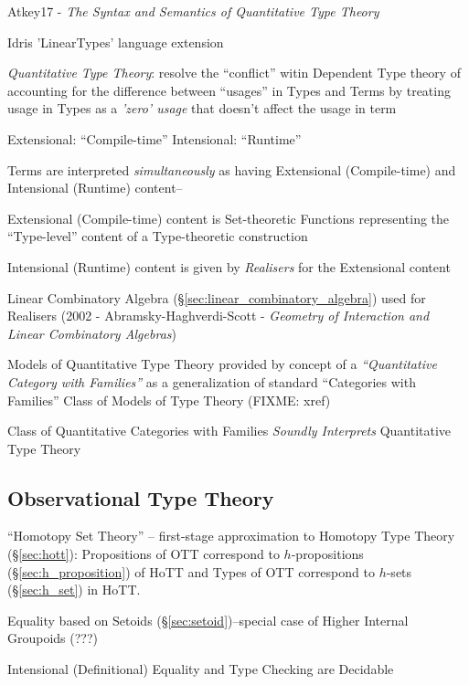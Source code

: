 Atkey17 - \emph{The Syntax and Semantics of Quantitative Type Theory}

Idris 'LinearTypes' language extension

\emph{Quantitative Type Theory}: resolve the ``conflict'' witin Dependent Type
theory of accounting for the difference between ``usages'' in Types and Terms by
treating usage in Types as a \emph{'zero' usage} that doesn't affect the
usage in term

Extensional: ``Compile-time''
Intensional: ``Runtime''

Terms are interpreted \emph{simultaneously} as having Extensional
(Compile-time) and Intensional (Runtime) content--

Extensional (Compile-time) content is Set-theoretic Functions representing the
``Type-level'' content of a Type-theoretic construction

Intensional (Runtime) content is given by \emph{Realisers} for the Extensional
content

Linear Combinatory Algebra (\S\ref{sec:linear_combinatory_algebra}) used for
Realisers (2002 - Abramsky-Haghverdi-Scott - \emph{Geometry of Interaction and
  Linear Combinatory Algebras})

Models of Quantitative Type Theory provided by concept of a
\emph{``Quantitative Category with Families''} as a generalization of standard
``Categories with Families'' Class of Models of Type Theory (FIXME: xref)

Class of Quantitative Categories with Families \emph{Soundly Interprets}
Quantitative Type Theory


\subsection{Observational Type Theory}\label{sec:observational_type}

``Homotopy Set Theory'' -- first-stage approximation to Homotopy Type
Theory (\S\ref{sec:hott}): Propositions of OTT correspond to
$h$-propositions (\S\ref{sec:h_proposition}) of HoTT and Types of OTT
correspond to $h$-sets (\S\ref{sec:h_set}) in HoTT.

Equality based on Setoids (\S\ref{sec:setoid})--special case of Higher
Internal Groupoids (???)

Intensional (Definitional) Equality and Type Checking are Decidable


